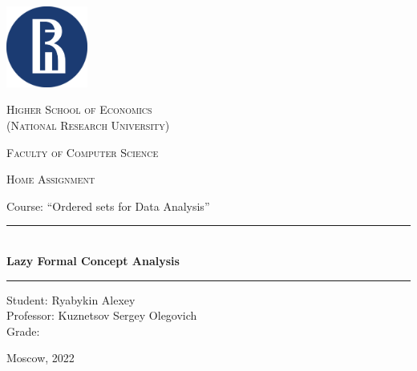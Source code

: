 \newcommand{\HRule}{\rule{\linewidth}{0.5mm}}

\begin{titlepage}

\centering
	\includegraphics[width=0.2\textwidth]{./title/logohse.png}\par\vspace{1cm}
	{\scshape \LARGE Higher School of Economics \\ \small(National Research University)\par}
	{\scshape \Large Faculty of Computer Science\par}
	\vspace{3cm}
	{\scshape\Large Home Assignment \par \Large{Course: ``Ordered sets for Data Analysis''}\par}
    \HRule \\[0.5cm]
    { \Large \bfseries Lazy Formal Concept Analysis}\\[0.2cm] %
    \HRule
	\vspace{3.5cm}
	\begin{flushright}
	Student: Ryabykin Alexey \\
	Professor: Kuznetsov Sergey Olegovich
	\\
	Grade: \underline{\hspace{0.2cm}}
    \end{flushright}
    \vfill

	{\large Moscow, 2022}
\end{titlepage}